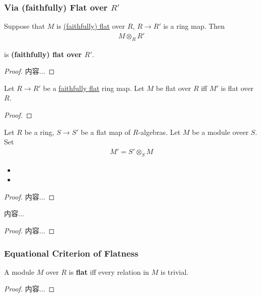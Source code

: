 \documentclass[Total.tex]{subfiles}
\begin{document}
				\subsubsection{Via (faithfully) Flat over $R'$}
				\begin{lemma}
					Suppose that $M$ is \underline{(faithfully) flat} over $R$, $R\rightarrow R'$ is a ring map. Then
					\begin{gather*}
						M\otimes_R R'
					\end{gather*}
					
					is \textbf{(faithfully) flat over $R'$}.
				\end{lemma}
				\begin{proof}
					内容...
				\end{proof}
				
				\begin{lemma}
					Let $R\rightarrow R'$ be a \underline{faithfully flat} ring map. Let $M$ be flat over $R$ iff $M'$ is flat over $R$.
				\end{lemma}
				\begin{proof}
					
				\end{proof}
				
				\begin{lemma}
					Let $R$ be a ring, $S\rightarrow S'$ be a flat map of $R$-algebras. Let $M$ be a module oveer $S$. Set
					\begin{gather*}
						M'=S'\otimes_S M
					\end{gather*}
					\begin{itemize}
						\item 
						\item 
					\end{itemize}
				\end{lemma}
				\begin{proof}
					内容...
				\end{proof}
				
				\begin{lemma}
					内容...
				\end{lemma}
				\begin{proof}
					内容...
				\end{proof}
				\subsubsection{Equational Criterion of Flatness}
				\begin{lemma}
					A module $M$ over $R$ is \textbf{flat} iff every relation in $M$ is trivial.
				\end{lemma}
				\begin{proof}
					内容...
				\end{proof}
\end{document}
